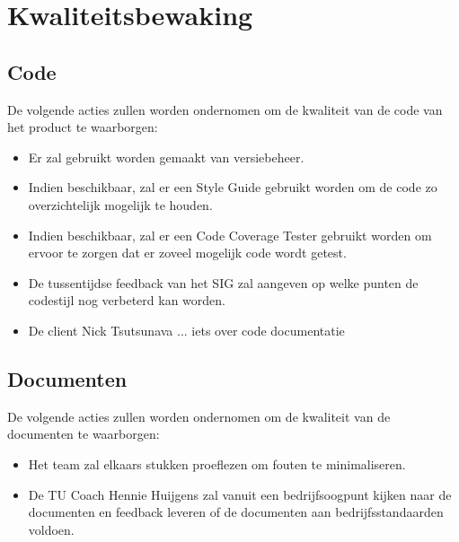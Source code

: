 \section{Kwaliteitsbewaking}
\subsection{Code}
De volgende acties zullen worden ondernomen om de kwaliteit van de code van het product te waarborgen:

\begin{itemize}
	\item Er zal gebruikt worden gemaakt van versiebeheer. 
	\item Indien beschikbaar, zal er een Style Guide gebruikt worden om de code zo overzichtelijk mogelijk te houden.
	\item Indien beschikbaar, zal er een Code Coverage Tester gebruikt worden om ervoor te zorgen dat er zoveel mogelijk code wordt getest. 
	\item De tussentijdse feedback van het SIG zal aangeven op welke punten de codestijl nog verbeterd kan worden.
	\item De client Nick Tsutsunava ... iets over code documentatie %
\end{itemize}

\subsection{Documenten}
De volgende acties zullen worden ondernomen om de kwaliteit van de documenten te waarborgen:
\begin{itemize}
	\item Het team zal elkaars stukken proeflezen om fouten te minimaliseren.
	\item De TU Coach Hennie Huijgens zal vanuit een bedrijfsoogpunt kijken naar de documenten en feedback leveren of de documenten aan bedrijfsstandaarden voldoen.
\end{itemize}

